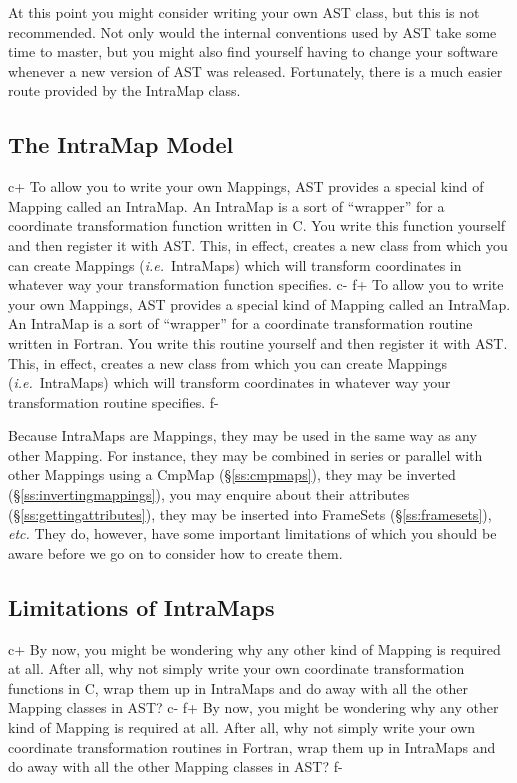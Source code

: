\documentclass[twoside,11pt]{article}
\newcommand{\secref}[1]{\S\ref{#1}}
\newcommand{\secref}[1]{\ref{#1}}
\begin{document}
At this point you might consider writing your own AST class, but this
is not recommended. Not only would the internal conventions used by
AST take some time to master, but you might also find yourself having
to change your software whenever a new version of AST was
released. Fortunately, there is a much easier route provided by the
IntraMap class.

\subsection{The IntraMap Model}

c+
To allow you to write your own Mappings, AST provides a special kind
of Mapping called an IntraMap. An IntraMap is a sort of ``wrapper''
for a coordinate transformation function written in C. You write this
function yourself and then register it with AST. This, in effect,
creates a new class from which you can create Mappings
({\em{i.e.}}\ IntraMaps) which will transform coordinates in whatever
way your transformation function specifies.
c-
f+
To allow you to write your own Mappings, AST provides a special kind
of Mapping called an IntraMap. An IntraMap is a sort of ``wrapper''
for a coordinate transformation routine written in Fortran. You write
this routine yourself and then register it with AST. This, in effect,
creates a new class from which you can create Mappings
({\em{i.e.}}\ IntraMaps) which will transform coordinates in whatever
way your transformation routine specifies.
f-

Because IntraMaps are Mappings, they may be used in the same way as
any other Mapping. For instance, they may be combined in series or
parallel with other Mappings using a CmpMap (\secref{ss:cmpmaps}),
they may be inverted (\secref{ss:invertingmappings}), you may enquire
about their attributes (\secref{ss:gettingattributes}), they may be
inserted into FrameSets (\secref{ss:framesets}), {\em{etc.}} They do,
however, have some important limitations of which you should be aware
before we go on to consider how to create them.

\subsection{\label{ss:intramaplimitations}Limitations of IntraMaps}

c+
By now, you might be wondering why any other kind of Mapping is
required at all. After all, why not simply write your own coordinate
transformation functions in C, wrap them up in IntraMaps and do away
with all the other Mapping classes in AST?
c-
f+
By now, you might be wondering why any other kind of Mapping is
required at all. After all, why not simply write your own coordinate
transformation routines in Fortran, wrap them up in IntraMaps and do
away with all the other Mapping classes in AST?
f-
\end{document}
